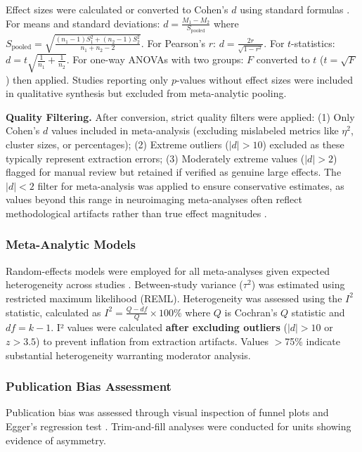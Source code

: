 \documentclass[9pt,onecolumn]{article}
\begin{document}
Effect sizes were calculated or converted to Cohen's $d$ using standard formulas \citep{borenstein2021}. For means and standard deviations: $d = \frac{M_1 - M_2}{S_{\text{pooled}}}$ where $S_{\text{pooled}} = \sqrt{\frac{(n_1-1)S_1^2 + (n_2-1)S_2^2}{n_1+n_2-2}}$. For Pearson's $r$: $d = \frac{2r}{\sqrt{1-r^2}}$. For $t$-statistics: $d = t \sqrt{\frac{1}{n_1} + \frac{1}{n_2}}$. For one-way ANOVAs with two groups: $F$ converted to $t$ ($t = \sqrt{F}$) then applied. Studies reporting only $p$-values without effect sizes were included in qualitative synthesis but excluded from meta-analytic pooling.

\textbf{Quality Filtering.} After conversion, strict quality filters were applied: (1) Only Cohen's $d$ values included in meta-analysis (excluding mislabeled metrics like $\eta^2$, cluster sizes, or percentages); (2) Extreme outliers ($|d| > 10$) excluded as these typically represent extraction errors; (3) Moderately extreme values ($|d| > 2$) flagged for manual review but retained if verified as genuine large effects. The $|d| < 2$ filter for meta-analysis was applied to ensure conservative estimates, as values beyond this range in neuroimaging meta-analyses often reflect methodological artifacts rather than true effect magnitudes \citep{borenstein2021}.

\subsubsection{Meta-Analytic Models}

Random-effects models were employed for all meta-analyses given expected heterogeneity across studies \citep{hedges1998}. Between-study variance ($\tau^2$) was estimated using restricted maximum likelihood (REML). Heterogeneity was assessed using the $I^2$ statistic, calculated as $I^2 = \frac{Q - df}{Q} \times 100\%$ where $Q$ is Cochran's $Q$ statistic and $df = k - 1$. I² values were calculated \textbf{after excluding outliers} ($|d| > 10$ or $z > 3.5$) to prevent inflation from extraction artifacts. Values $>$75\% indicate substantial heterogeneity warranting moderator analysis.

\subsubsection{Publication Bias Assessment}

Publication bias was assessed through visual inspection of funnel plots and Egger's regression test \citep{egger1997}. Trim-and-fill analyses were conducted for units showing evidence of asymmetry.
\end{document}
